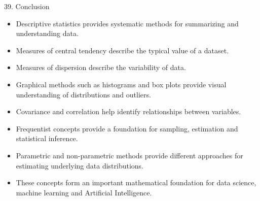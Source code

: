 
\begin{frame}{39. Conclusion}

\begin{itemize}

    \item Descriptive statistics provides systematic methods for
    summarizing and understanding data.

    \item Measures of central tendency describe the typical value
    of a dataset.

    \item Measures of dispersion describe the variability of data.

    \item Graphical methods such as histograms and box plots
    provide visual understanding of distributions and outliers.

    \item Covariance and correlation help identify relationships
    between variables.

    \item Frequentist concepts provide a foundation for
    sampling, estimation and statistical inference.

    \item Parametric and non-parametric methods provide different
    approaches for estimating underlying data distributions.

    \item These concepts form an important mathematical foundation
    for data science, machine learning and Artificial Intelligence.

\end{itemize}

\end{frame}